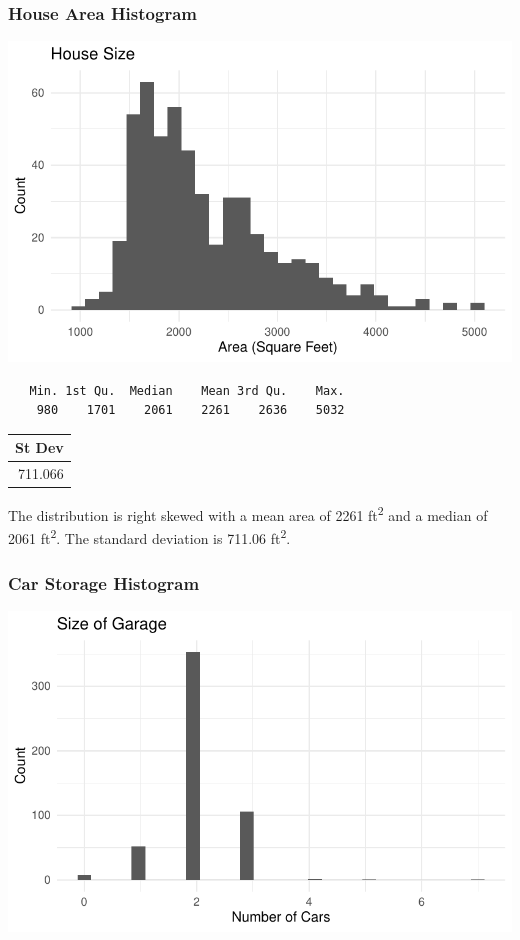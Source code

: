 \documentclass[
  letterpaper,
  DIV=11,
  numbers=noendperiod]{scrartcl}
\begin{document}
\hypertarget{house-area-histogram}{%
\subsubsection{House Area Histogram}\label{house-area-histogram}}

\includegraphics{final_project_files/figure-pdf/unnamed-chunk-1-1.pdf}

\begin{verbatim}
   Min. 1st Qu.  Median    Mean 3rd Qu.    Max. 
    980    1701    2061    2261    2636    5032 
\end{verbatim}

\begin{tabular}{r}
\hline
St Dev\\
\hline
711.066\\
\hline
\end{tabular}

The distribution is right skewed with a mean area of 2261
ft\textsuperscript{2} and a median of 2061 ft\textsuperscript{2}. The
standard deviation is 711.06 ft\textsuperscript{2}.

\hypertarget{car-storage-histogram}{%
\subsubsection{Car Storage Histogram}\label{car-storage-histogram}}

\includegraphics{final_project_files/figure-pdf/unnamed-chunk-3-1.pdf}
\end{document}

